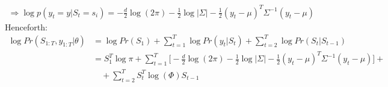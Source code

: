 \begin{align*}
    \Rightarrow
    \log{p(y_t=y|S_t=s_i)}
    =-\frac{d}{2}\log{(2\pi)}-\frac{1}{2}\log{|\Sigma|}-\frac{1}{2}(y_t-\mu)^T\Sigma^{-1}(y_t-\mu)
\end{align*}
Henceforth:
\begin{align*}
    \log{Pr(S_{1:T}, y_{1:T}|\theta)}
    &=\log{Pr(S_1)}+\sum_{t=1}^{T}\log{Pr(y_t|S_t)}+\sum_{t=2}^{T}\log{Pr(S_t|S_{t-1})}\\
    &=S_1^T\log{\pi}+\sum_{t=1}^{T}\biggl[-\frac{d}{2}\log{(2\pi)}-\frac{1}{2}\log{|\Sigma|}-\frac{1}{2}(y_t-\mu)^T\Sigma^{-1}(y_t-\mu)\biggr]+\\
    &\quad +\sum_{t=2}^{T}S_t^T\log{(\Phi)}S_{t-1}
\end{align*}